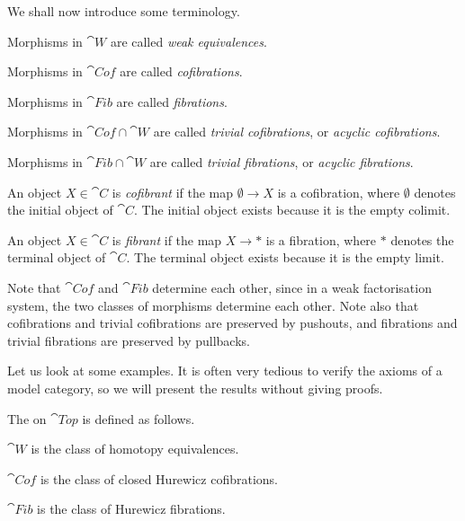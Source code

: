 We shall now introduce some terminology.
\begin{itms}
    \item Morphisms in $\cat W$ are called \emph{weak equivalences}.
    \item Morphisms in $\cat{Cof}$ are called \emph{cofibrations}.
    \item Morphisms in $\cat{Fib}$ are called \emph{fibrations}.
    \item Morphisms in $\cat{Cof}\cap\cat W$ are called \emph{trivial cofibrations},
    or \emph{acyclic cofibrations}.
    \item Morphisms in $\cat{Fib}\cap\cat W$ are called \emph{trivial fibrations},
    or \emph{acyclic fibrations}.
    \item An object $X\in\cat C$ is \emph{cofibrant} if the map $\emptyset\to X$ is a cofibration,
    where $\emptyset$ denotes the initial object of $\cat C$.
    The initial object exists because it is the empty colimit.
    \item An object $X\in\cat C$ is \emph{fibrant} if the map $X\to*$ is a fibration,
    where $*$ denotes the terminal object of $\cat C$.
    The terminal object exists because it is the empty limit.
\end{itms}

Note that $\cat{Cof}$ and $\cat{Fib}$ determine each other,
since in a weak factorisation system,
the two classes of morphisms determine each other.
Note also that cofibrations and trivial cofibrations
are preserved by pushouts,
and fibrations and trivial fibrations
are preserved by pullbacks.

Let us look at some examples.
It is often very tedious to verify the axioms of a model category,
so we will present the results without giving proofs.

\begin{example}
    The  on $\cat{Top}$ is defined as follows.
    \begin{itms}
        \item $\cat{W}$ is the class of homotopy equivalences.
        \item $\cat{Cof}$ is the class of closed Hurewicz cofibrations.
        \item $\cat{Fib}$ is the class of Hurewicz fibrations. \varqed
    \end{itms}
\end{example}

